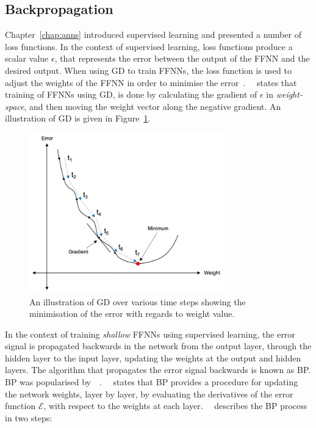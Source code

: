 \subsection{Backpropagation}\label{sec:heuristics:gd:backpropagation}

Chapter~\ref{chap:anns} introduced supervised learning and presented a number of loss functions. In the context of supervised learning, loss functions produce a scalar value $\epsilon$, that represents the error between the output of the \acs{FFNN} and the desired output. When using \acs{GD} to train \acp{FFNN}, the loss function is used to adjust the weights of the \acs{FFNN} in order to minimise the error~\cite{ref:engelbrecht:2007}.~\citeauthor{ref:engelbrecht:2007}~\cite{ref:engelbrecht:2007} states that training of \acp{FFNN} using \acs{GD}, is done by calculating the gradient of $\epsilon$ in \textit{weight-space}, and then moving the weight vector along the negative gradient. An illustration of \acs{GD} is given in Figure~\ref{fig:heuristics:gd:gd_illustration}.

\begin{figure}[htbp]
      \centering
      \includegraphics[width=0.75\textwidth]{images/gradient_descent.pdf}
      \caption{An illustration of \acf{GD} over various time steps showing the minimisation of the error with regards to weight value.}
      \label{fig:heuristics:gd:gd_illustration}
\end{figure}

In the context of training \textit{shallow} \acp{FFNN} using supervised learning, the error signal is propagated backwards in the network from the output layer, through the hidden layer to the input layer, updating the weights at the output and hidden layers. The algorithm that propagates the error signal backwards is known as \acf{BP}. \Acs{BP} was popularised by~\citeauthor{ref:werbos:1994}~\cite{ref:werbos:1994}.~\citeauthor{ref:nel:2021}~\cite{ref:nel:2021} states that \acs{BP} provides a procedure for updating the network weights, layer by layer, by evaluating the derivatives of the error function $\mathcal{E}$, with respect to the weights at each layer.~\citeauthor{ref:engelbrecht:2007}~\cite{ref:engelbrecht:2007} describes the \acs{BP} process in two steps:

